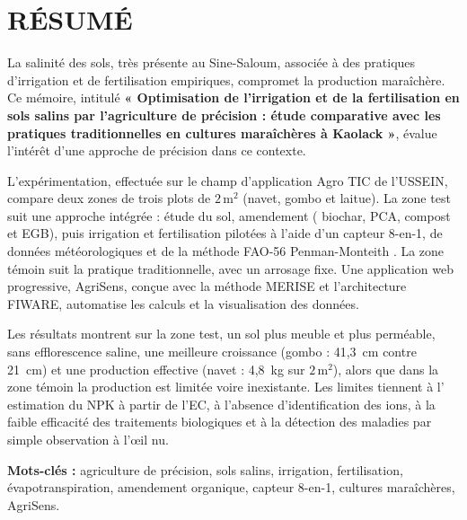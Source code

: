 \chapter*{RÉSUMÉ}
La salinité des sols, très présente au Sine-Saloum, associée à des pratiques d'irrigation et de fertilisation empiriques, compromet la production maraîchère. Ce mémoire, intitulé \textbf{« Optimisation de l’irrigation et de la fertilisation en sols salins par l’agriculture de précision : étude comparative avec les pratiques traditionnelles en cultures maraîchères à Kaolack »}, évalue l'intérêt d'une approche de précision dans ce contexte.

L'expérimentation, effectuée sur le champ d'application Agro TIC de l'USSEIN, compare deux zones de trois plots de $2\,\mathrm{m^2}$ (navet, gombo et laitue). La zone test suit une approche intégrée : étude du sol, amendement ( biochar, PCA, compost et EGB), puis irrigation et fertilisation pilotées à l'aide d'un capteur 8-en-1, de données météorologiques et de la méthode FAO-56 Penman-Monteith \cite{allen_crop_1998-1}. La zone témoin suit la pratique traditionnelle, avec un arrosage fixe. Une application web progressive, AgriSens, conçue avec la méthode MERISE et l'architecture FIWARE, automatise les calculs et la visualisation des données.

Les résultats montrent sur la zone test, un sol plus meuble et plus perméable, sans efflorescence saline, une meilleure croissance (gombo : 41,3~cm contre 21~cm) et une production effective (navet : 4,8~kg sur $2\,\mathrm{m^2}$), alors que dans la zone témoin la production est limitée voire inexistante. Les limites tiennent à l' estimation du NPK à partir de l'EC, à l'absence d'identification des ions, à la faible efficacité des traitements biologiques et à la détection des maladies par simple observation à l'œil nu.

\vspace{1em}
\noindent \textbf{Mots-clés :} agriculture de précision, sols salins, irrigation, fertilisation, évapotranspiration, amendement organique, capteur 8-en-1, cultures maraîchères, AgriSens.